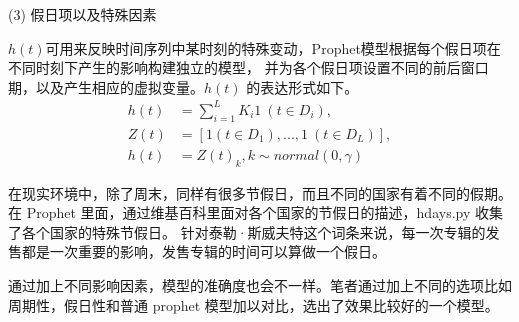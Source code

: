 (3) 假日项以及特殊因素

$h(t)$可用来反映时间序列中某时刻的特殊变动，Prophet模型根据每个假日项在不同时刻下产生的影响构建独立的模型，
并为各个假日项设置不同的前后窗口期，以及产生相应的虚拟变量\cite{JSJA2019S1097}。$h(t)$ 的表达形式如下。
\begin{align}
	h(t) & =\sum_{i=1}^{L}K_{i}1\ (t\in D_{i}),  \\
	Z(t) & =[1(t\in D_{1}),...,1\ (t\in D_{L})], \\
	h(t) & =Z(t)_{k},k\sim normal(0, \gamma)
\end{align}

在现实环境中，除了周末，同样有很多节假日，而且不同的国家有着不同的假期。
在 Prophet 里面，通过维基百科里面对各个国家的节假日的描述，hdays.py 收集了各个国家的特殊节假日。
针对泰勒·斯威夫特这个词条来说，每一次专辑的发售都是一次重要的影响，发售专辑的时间可以算做一个假日。

通过加上不同影响因素，模型的准确度也会不一样。笔者通过加上不同的选项比如周期性，假日性和普通 prophet 模型加以对比，选出了效果比较好的一个模型。

